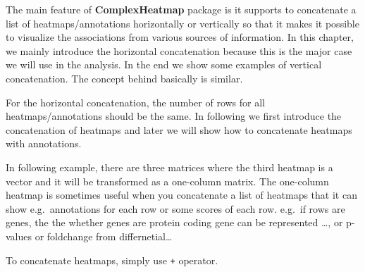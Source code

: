 \documentclass[]{book}
\theoremstyle{definition}
\theoremstyle{definition}
\theoremstyle{definition}
\theoremstyle{remark}
\begin{document}
The main feature of \textbf{ComplexHeatmap} package is it supports to
concatenate a list of heatmaps/annotations horizontally or vertically so
that it makes it possible to visualize the associations from various
sources of information. In this chapter, we mainly introduce the
horizontal concatenation because this is the major case we will use in
the analysis. In the end we show some examples of vertical
concatenation. The concept behind basically is similar.

For the horizontal concatenation, the number of rows for all
heatmaps/annotations should be the same. In following we first introduce
the concatenation of heatmaps and later we will show how to concatenate
heatmaps with annotations.

In following example, there are three matrices where the third heatmap
is a vector and it will be transformed as a one-column matrix. The
one-column heatmap is sometimes useful when you concatenate a list of
heatmaps that it can show e.g.~annotations for each row or some scores
of each row. e.g.~if rows are genes, the the whether genes are protein
coding gene can be represented \ldots{}, or p-values or foldchange from
differnetial\ldots{}

To concatenate heatmaps, simply use \texttt{+} operator.
\end{document}

